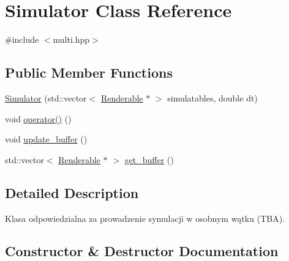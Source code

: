 \hypertarget{class_simulator}{}\section{Simulator Class Reference}
\label{class_simulator}


{\ttfamily \#include $<$multi.\+hpp$>$}

\subsection*{Public Member Functions}
\begin{DoxyCompactItemize}
\item 
\hyperlink{class_simulator_a597385e2e9f501fbbd936e3b281cd2b1}{Simulator} (std\+::vector$<$ \hyperlink{class_renderable}{Renderable} $\ast$ $>$ simulatables, double dt)
\item 
void \hyperlink{class_simulator_ab844c2061cc955301bd63016e67ed2e0}{operator()} ()
\item 
void \hyperlink{class_simulator_a21d308aa878b8a23482a00d8939a9ada}{update\+\_\+buffer} ()
\item 
std\+::vector$<$ \hyperlink{class_renderable}{Renderable} $\ast$ $>$ \hyperlink{class_simulator_a276673b4c7124e93d037f8b0e857ea11}{get\+\_\+buffer} ()
\end{DoxyCompactItemize}


\subsection{Detailed Description}
Klasa odpowiedzialna za prowadzenie symulacji w osobnym wątku (T\+BA). 

\subsection{Constructor \& Destructor Documentation}
